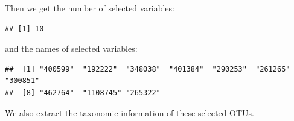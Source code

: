 \documentclass[openany]{book}
\newenvironment{Shaded}{\begin{snugshade}}{\end{snugshade}}
\newcommand{\KeywordTok}[1]{\textcolor[rgb]{0.13,0.29,0.53}{\textbf{#1}}}
\newcommand{\DataTypeTok}[1]{\textcolor[rgb]{0.13,0.29,0.53}{#1}}
\newcommand{\DecValTok}[1]{\textcolor[rgb]{0.00,0.00,0.81}{#1}}
\newcommand{\StringTok}[1]{\textcolor[rgb]{0.31,0.60,0.02}{#1}}
\newcommand{\OperatorTok}[1]{\textcolor[rgb]{0.81,0.36,0.00}{\textbf{#1}}}
\newcommand{\NormalTok}[1]{#1}
\begin{document}
Then we get the number of selected variables:

\begin{Shaded}
\end{Shaded}

\begin{verbatim}
## [1] 10
\end{verbatim}

and the names of selected variables:

\begin{Shaded}
\end{Shaded}

\begin{verbatim}
##  [1] "400599"  "192222"  "348038"  "401384"  "290253"  "261265"  "300851" 
##  [8] "462764"  "1108745" "265322"
\end{verbatim}

We also extract the taxonomic information of these selected OTUs.

\begin{Shaded}
\end{Shaded}
\end{document}
